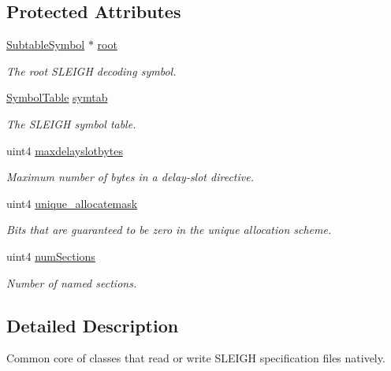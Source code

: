 \subsection*{Protected Attributes}
\begin{DoxyCompactItemize}
\item 
\mbox{\hyperlink{class_subtable_symbol}{Subtable\+Symbol}} $\ast$ \mbox{\hyperlink{class_sleigh_base_a63699520bf1186106cf8200718b51039}{root}}
\begin{DoxyCompactList}\small\item\em The root S\+L\+E\+I\+GH decoding symbol. \end{DoxyCompactList}\item 
\mbox{\hyperlink{class_symbol_table}{Symbol\+Table}} \mbox{\hyperlink{class_sleigh_base_ab7bf39a81c8133d7b21d491257b2627d}{symtab}}
\begin{DoxyCompactList}\small\item\em The S\+L\+E\+I\+GH symbol table. \end{DoxyCompactList}\item 
uint4 \mbox{\hyperlink{class_sleigh_base_aeaa260676163d56933c45d67243b74c3}{maxdelayslotbytes}}
\begin{DoxyCompactList}\small\item\em Maximum number of bytes in a delay-\/slot directive. \end{DoxyCompactList}\item 
uint4 \mbox{\hyperlink{class_sleigh_base_a846f60e02230c33557328d9e0d7f8914}{unique\+\_\+allocatemask}}
\begin{DoxyCompactList}\small\item\em Bits that are guaranteed to be zero in the unique allocation scheme. \end{DoxyCompactList}\item 
uint4 \mbox{\hyperlink{class_sleigh_base_ad2fa79db86516492f21ed6d826e7b2c4}{num\+Sections}}
\begin{DoxyCompactList}\small\item\em Number of {\itshape named} sections. \end{DoxyCompactList}\end{DoxyCompactItemize}


\subsection{Detailed Description}
Common core of classes that read or write S\+L\+E\+I\+GH specification files natively. 

